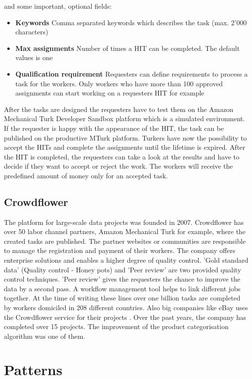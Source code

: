 and some important, optional fields: 
\begin{itemize}
	\item \textbf{Keywords} Comma separated keywords which describes the task (max. 2'000 characters) 
	\item \textbf{Max assignments} Number of times a HIT can be completed. The default values is one 
	\item \textbf{Qualification requirement} Requesters can define requirements to process a task for the workers. Only workers who have more than 100 approved assignments can start working on a requesters HIT for example 
\end{itemize}
After the tasks are designed the requesters have to test them on the Amazon Mechanical Turk Developer Sandbox platform which is a simulated environment. If the requester is happy with the appearance of the HIT, the task can be published on the productive MTurk platform. Turkers have now the possibility to accept the HITs and complete the assignments until the lifetime is expired. After the HIT is completed, the requesters can take a look at the results and have to decide if they want to accept or reject the work. The workers will receive the predefined amount of money only for an accepted task. 

\subsection{Crowdflower}
The platform for large-scale data projects was founded in 2007. Crowdflower has over 50 labor channel partners, Amazon Mechanical Turk for example, where the created tasks are published. The partner websites or communities are responsible to manage the registration and payment of their workers. The company offers enterprise solutions and enables a higher degree of quality control. 'Gold standard data' (Quality control - Honey pots) and 'Peer review' are two provided quality control techniques. 'Peer review' gives the requesters the chance to improve the data by a second pass. A workflow management tool helps to link different jobs together. At the time of writing these lines over one billion tasks are completed by workers domiciled in 208 different countries. Also big companies like eBay uses the Crowdflower service for their projects \cite{crowdflower_casestudy}. Over the past years, the company has completed over 15 projects. The improvement of the product categorisation algorithm was one of them.
\section{Patterns}

